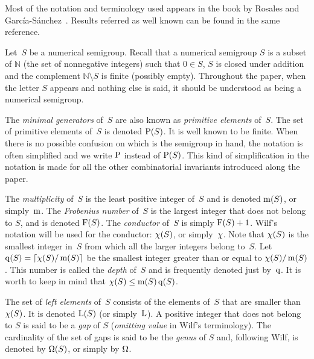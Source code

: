 Most of the notation and terminology used appears in the book by Rosales and García-Sánchez~\cite{RosalesGarcia2009Book-Numerical}. Results referred as well known can be found in the same reference.

Let~$S$ be a numerical semigroup. 
Recall that a numerical semigroup $S$ is a subset of $\mathbb{N}$ (the set of nonnegative integers) such that $0 \in S$, $S$ is closed under addition and the complement $\mathbb{N} \setminus S$ is finite (possibly empty).
Throughout the paper, when the letter $S$ appears and nothing else is said, it should be understood as being a numerical semigroup. 

The \emph{minimal generators} of~$S$ are also known as \emph{primitive elements} of~$S$.
The set of primitive elements of~$S$ is denoted $\operatorname{P}(S)$. It is well known to be finite. When there is no possible confusion on which is the semigroup in hand, the notation is often simplified and we write  $\operatorname{P}$ instead of $\operatorname{P}(S)$. This kind of simplification in the notation is made for all the other combinatorial invariants introduced along the paper.

The \emph{multiplicity} of~$S$ is the least positive integer of~$S$ and is denoted $\operatorname{m}(S)$, or simply~$\operatorname{m}$.
The \emph{Frobenius number} of~$S$ is the largest integer that does not belong to $S$, and is denoted $\operatorname{F}(S)$.
The \emph{conductor} of~$S$ is simply $\operatorname{F}(S) +1$. Wilf's notation will be used for the conductor: $\operatorname{\chi}(S)$, or simply~$\operatorname{\chi}$. Note that $\operatorname{\chi}(S)$ is the smallest integer in~$S$ from which all the larger integers belong to~$S$. Let $\operatorname{q}(S)=\lceil \operatorname{\chi}(S)/\operatorname{m}(S)\rceil$ be the smallest integer greater than or equal to $\operatorname{\chi}(S)/\operatorname{m}(S)$. This number is called the \emph{depth} of~$S$ and is frequently denoted just by~$\operatorname{q}$. It is worth to keep in mind that $\operatorname{\chi}(S)\le \operatorname{m}(S)\operatorname{q}(S)$.

The set of \emph{left elements} of~$S$ consists of the elements of~$S$ that are smaller than $\operatorname{\chi}(S)$. It is denoted $\operatorname{L}(S)$ (or simply~$\operatorname{L}$).
A positive integer that does not belong to $S$ is said to be a \emph{gap} of $S$ (\emph{omitting value} in Wilf's terminology). The cardinality of the set of gaps is said to be the \emph{genus} of $S$ and, following Wilf, is denoted by $\operatorname{\Omega}(S)$, or simply by $\operatorname{\Omega}$. 

